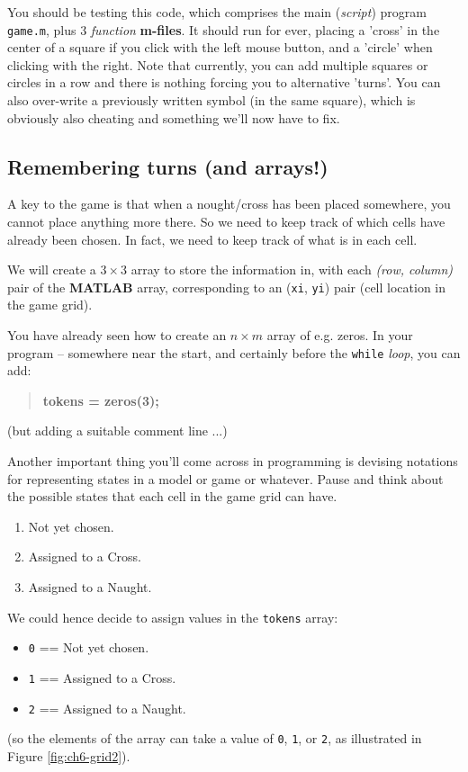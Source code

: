 \documentclass{tufte-book} %
\newenvironment{docspecbold}{\begin{quotation}\ttfamily\bfseries\parskip0pt\parindent0pt\ignorespaces}{\end{quotation}}
\begin{document}
You should be testing this code, which comprises the main (\textit{script}) program \texttt{game.m}, plus 3 \textit{function} \textbf{m-files}. It should run for ever, placing a 'cross' in the center of a square if you click with the left mouse button, and a 'circle' when clicking with the right. Note that currently, you can add multiple squares or circles in a row and there is nothing forcing you to alternative 'turns'. You can also over-write a previously written symbol (in the same square), which is obviously also cheating and something we'll now have to fix.


\subsection{Remembering turns (and arrays!)}

A key to the game is that when a nought/cross has been placed somewhere, you cannot place anything more there. So we need to keep track of which cells have already been chosen. In fact, we need to keep track of what is in each cell.

We will create a \(3\times3\) array to store the information in, with each \textit{(row, column)} pair of the \textbf{MATLAB} array, corresponding to an (\texttt{xi}, \texttt{yi}) pair (cell location in the game grid).

You have already seen how to create an \(n\times m\) array of e.g. zeros. In your program -- somewhere near the start, and certainly before the \texttt{while} \textit{loop}, you can add:
\begin{docspecbold}
tokens = zeros(3);
\end{docspecbold}
(but adding a suitable comment line ...)

Another important thing you'll come across in programming is devising notations for representing states in a model or game or whatever. Pause and think about the possible states that each cell in the game grid can have.
\begin{enumerate}[noitemsep]
\item Not yet chosen.
\item Assigned to a Cross.
\item Assigned to a Naught.
\end{enumerate}
We could hence decide to assign values in the \texttt{tokens} array:
\begin{itemize}[noitemsep]
\item[] \texttt{0} == Not yet chosen.
\item[] \texttt{1} == Assigned to a Cross.
\item[] \texttt{2} == Assigned to a Naught.
\end{itemize}
(so the elements of the array can take a value of \texttt{0}, \texttt{1}, or \texttt{2}, as illustrated in Figure \ref{fig:ch6-grid2}).
\end{document}
